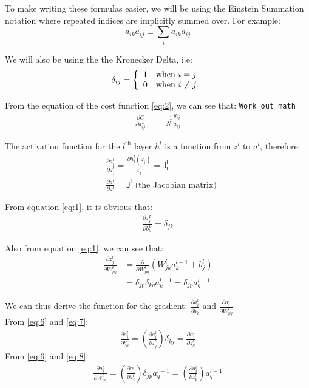 \documentclass[11pt,letterpaper]{article}
\begin{document}
To make writing these formulas easier, we will be using the Einstein Summation notation where repeated indices are implicitly summed over. For example:
$$a_{ik}a_{ij}\equiv \sum_ia_{ik}a_{ij}$$

We will also be using the the Kronecker Delta, i.e:
$$\delta_{ij}=
	\left\{
		\begin{array}{ll}
		1&{\rm when~} i=j\\
		0&{\rm when~} i\neq j.
		\end{array}
	\right.
$$

From the equation of the cost function \ref{eq:2}, we can see that: \texttt{Work out math}
\begin{align}
\frac{\partial C}{\partial a^L_{ij}}&=\frac{-1}{N}\frac{y_{ij}}{a_{ij}} \label{eq:5}
\end{align}

The activation function for the $l^{\text{th}}$ layer $h^l$ is a function from $z^l$ to $a^l$, therefore:
\begin{align}
&\frac{\partial a_i^l}{\partial z_j^l} = \frac{\partial h_i^l(z_j^l)}{z_j^l} = \mathsf{J^l_{ij}}\nonumber\\
&\frac{\partial a^l}{\partial z^l} = \mathsf{J^l} \text{\ \ \ \ \ (the Jacobian matrix)} \label{eq:6}
\end{align}

From equation \ref{eq:1}, it is obvious that:
\begin{align}
\frac{\partial z_j^L}{\partial b_k^L}=\delta_{jk} \label{eq:7}
\end{align}

Also from equation \ref{eq:1}, we can see that:
\begin{align}
\frac{\partial z_j^l}{\partial W_{pq}^l}&=\frac{\partial}{\partial W_{pq}^l}(W^l_{jk}a_k^{l-1}+b_j^l)\nonumber\\
&= \delta_{jp}\delta_{kq}a_k^{l-1} = \delta_{jp}a_q^{l-1} \label{eq:8}
\end{align}

We can thus derive the function for the gradient: $\frac{\partial a_i^l}{\partial b_k^l}$ and $\frac{\partial a_i^l}{\partial W_{pq}^l}$\\
From \ref{eq:6} and \ref{eq:7}:
\begin{align}
\frac{\partial a_i^l}{\partial b_k^l} = \left(\frac{\partial a_i^l}{\partial z_j^l}\right)\delta_{kj} = \frac{\partial a_i^l}{\partial z_k^l} \label{eq:9}
\end{align}
From \ref{eq:6} and \ref{eq:8}:
\begin{align}
\frac{\partial a_i^l}{\partial W_{pq}^l}=\left(\frac{\partial a_i^l}{\partial z_j^l}\right)\delta_{jp}a_q^{l-1}=\left(\frac{\partial a_i^l}{\partial z_p^l}\right)a_q^{l-1} \label{eq:10}
\end{align}
\end{document}
